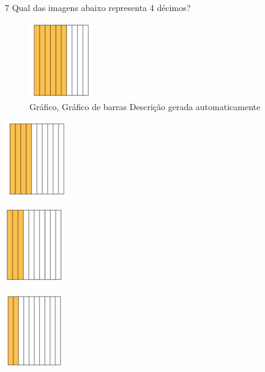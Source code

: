 {%

\num{7} Qual das imagens abaixo representa 4 décimos?

\begin{escolha}

\item
  \begin{figure}
  \centering
  \includegraphics[width=1.0625in,height=1.28788in]{./_SAEB_9_MAT/media/image47.png}
  \caption{Gráfico, Gráfico de barras Descrição gerada automaticamente}
  \end{figure}

\item
  \includegraphics[width=1.07728in,height=1.29167in]{./_SAEB_9_MAT/media/image48.png}

\item
  \includegraphics[width=1.00521in,height=1.25518in]{./_SAEB_9_MAT/media/image49.png}

\item
  \includegraphics[width=0.9751in,height=1.25in]{./_SAEB_9_MAT/media/image50.png}
\end{escolha}

}
